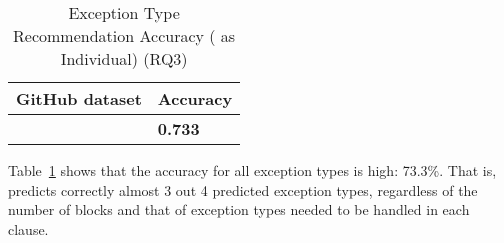 \begin{table}[t]%
  \caption{Exception Type Recommendation Accuracy ({\xtype} as Individual) (RQ3)}
  \vspace{-12pt}
  \small
	\begin{center}
		\renewcommand{\arraystretch}{1}
		\begin{tabular}{| p{3.05cm}<{\centering} | p{1.2cm}<{\centering}|}
		  \hline
			GitHub dataset  & Accuracy \\
			\hline
			\xtype   & \textbf{0.733} \\
			\hline
		\end{tabular}
		\label{tab:xtype-3}
	\end{center}
\end{table}

Table~\ref{tab:xtype-3} shows that the accuracy for all exception
types is high: 73.3\%. That is,
{\xtype} predicts correctly almost 3 out 4 predicted exception types,
regardless of the number of  blocks and that of
exception types needed to be handled in each  clause.
